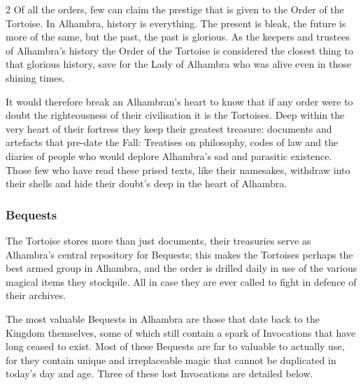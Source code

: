 \begin{multicols}{2}
Of all the orders, few can claim the prestige that is given to the Order of the Tortoise. In Alhambra, history is everything. The present is bleak, the future is more of the same, but the past, the past is glorious. As the keepers and trustees of Alhambra's history the Order of the Tortoise is considered the closest thing to that glorious history, save for the Lady of Alhambra who was alive even in those shining times. 

It would therefore break an Alhambran's heart to know that if any order were to doubt the righteousness of their civilisation it is the Tortoises. Deep within the very heart of their fortress they keep their greatest treasure: documents and artefacts that pre-date the Fall: Treatises on philosophy, codes of law and the diaries of people who would deplore Alhambra's sad and parasitic existence. Those few who have read these prised texts, like their namesakes, withdraw into their shells and hide their doubt's deep in the heart of Alhambra. 

\subsubsection*{Bequests}

The Tortoise stores more than just documents, their treasuries serve as Alhambra's central repository for Bequests; this makes the Tortoises perhaps the best armed group in Alhambra, and the order is drilled daily in use of the various magical items they stockpile. All in case they are ever called to fight in defence of their archives. 

The most valuable Bequests in Alhambra are those that date back to the Kingdom themselves, some of which still contain a spark of Invocations that have long ceased to exist. Most of these Bequests are far to valuable to actually use, for they contain unique and irreplaceable magic that cannot be duplicated in today’s day and age. Three of these lost Invocations are detailed below. 


\end{multicols}
